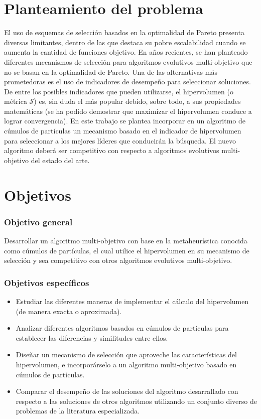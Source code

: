 \section*{Planteamiento del problema}

El uso de esquemas de selecci\'on basados en la optimalidad de Pareto presenta diversas limitantes, dentro de las que destaca
su pobre escalabilidad cuando se aumenta la cantidad de funciones objetivo. En a\~nos recientes, se han planteado diferentes 
mecanismos de selecci\'on para algoritmos evolutivos multi-objetivo que no se basan en la optimalidad de Pareto. Una de las 
alternativas m\'as prometedoras es el uso de indicadores de desempe\~no para seleccionar soluciones. De entre los posibles 
indicadores que pueden utilizarse, el hipervolumen (o m\'etrica $\mathcal{S}$) es, sin duda el m\'as popular debido, sobre 
todo, a sus propiedades matem\'aticas (se ha podido demostrar que maximizar el hipervolumen conduce a lograr convergencia). 
En este trabajo se plantea incorporar en un algoritmo de c\'umulos de part\'iculas un mecanismo  basado en el indicador de 
hipervolumen para seleccionar a los mejores l\'ideres que conducir\'an la b\'usqueda. El nuevo algoritmo deber\'a ser competitivo
con respecto a algoritmos evolutivos multi-objetivo del estado del arte.

\section*{Objetivos}

\subsubsection*{Objetivo general}

Desarrollar un algoritmo multi-objetivo con base en la metaheur\'istica conocida como c\'umulos de part\'iculas, el cual utilice el 
hipervolumen en su mecanismo de selecci\'on y sea competitivo con otros algoritmos evolutivos multi-objetivo.

\subsubsection*{Objetivos espec\'ificos}

\begin{itemize}
 \item Estudiar las diferentes maneras de implementar el c\'alculo del hipervolumen (de manera exacta o aproximada).
 \item Analizar diferentes algoritmos basados en c\'umulos de part\'iculas para establecer las diferencias y 
      similitudes entre ellos.
 \item Dise\~nar un mecanismo de selecci\'on que aproveche las caracter\'isticas del hipervolumen, e incorpor\'arselo 
 a un algoritmo multi-objetivo basado en c\'umulos de part\'iculas.
 \item Comparar el desempe\~no de las soluciones del algoritmo desarrallado con respecto a las soluciones de otros algoritmos
  utilizando un conjunto diverso de problemas de la literatura especializada.
\end{itemize}

